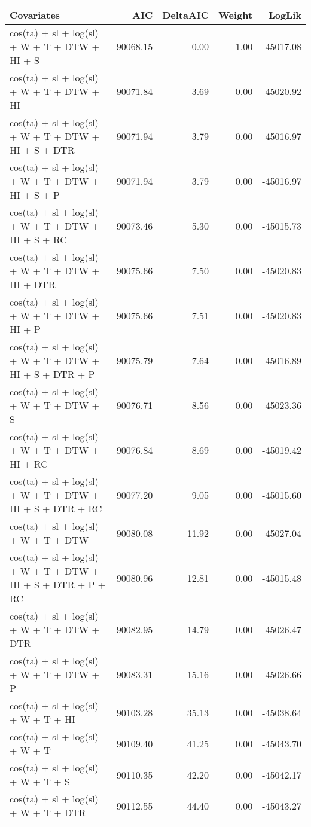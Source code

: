 \begin{tabular}{lrrrr}
  \toprule
Covariates & AIC & DeltaAIC & Weight & LogLik \\ 
  \midrule
cos(ta) + sl + log(sl) + W + T + DTW + HI + S & 90068.15 & 0.00 & 1.00 & -45017.08 \\ 
  cos(ta) + sl + log(sl) + W + T + DTW + HI & 90071.84 & 3.69 & 0.00 & -45020.92 \\ 
  cos(ta) + sl + log(sl) + W + T + DTW + HI + S + DTR & 90071.94 & 3.79 & 0.00 & -45016.97 \\ 
  cos(ta) + sl + log(sl) + W + T + DTW + HI + S + P & 90071.94 & 3.79 & 0.00 & -45016.97 \\ 
  cos(ta) + sl + log(sl) + W + T + DTW + HI + S + RC & 90073.46 & 5.30 & 0.00 & -45015.73 \\ 
  cos(ta) + sl + log(sl) + W + T + DTW + HI + DTR & 90075.66 & 7.50 & 0.00 & -45020.83 \\ 
  cos(ta) + sl + log(sl) + W + T + DTW + HI + P & 90075.66 & 7.51 & 0.00 & -45020.83 \\ 
  cos(ta) + sl + log(sl) + W + T + DTW + HI + S + DTR + P & 90075.79 & 7.64 & 0.00 & -45016.89 \\ 
  cos(ta) + sl + log(sl) + W + T + DTW + S & 90076.71 & 8.56 & 0.00 & -45023.36 \\ 
  cos(ta) + sl + log(sl) + W + T + DTW + HI + RC & 90076.84 & 8.69 & 0.00 & -45019.42 \\ 
  cos(ta) + sl + log(sl) + W + T + DTW + HI + S + DTR + RC & 90077.20 & 9.05 & 0.00 & -45015.60 \\ 
  cos(ta) + sl + log(sl) + W + T + DTW & 90080.08 & 11.92 & 0.00 & -45027.04 \\ 
  cos(ta) + sl + log(sl) + W + T + DTW + HI + S + DTR + P + RC & 90080.96 & 12.81 & 0.00 & -45015.48 \\ 
  cos(ta) + sl + log(sl) + W + T + DTW + DTR & 90082.95 & 14.79 & 0.00 & -45026.47 \\ 
  cos(ta) + sl + log(sl) + W + T + DTW + P & 90083.31 & 15.16 & 0.00 & -45026.66 \\ 
  cos(ta) + sl + log(sl) + W + T + HI & 90103.28 & 35.13 & 0.00 & -45038.64 \\ 
  cos(ta) + sl + log(sl) + W + T & 90109.40 & 41.25 & 0.00 & -45043.70 \\ 
  cos(ta) + sl + log(sl) + W + T + S & 90110.35 & 42.20 & 0.00 & -45042.17 \\ 
  cos(ta) + sl + log(sl) + W + T + DTR & 90112.55 & 44.40 & 0.00 & -45043.27 \\ 

\end{tabular}
